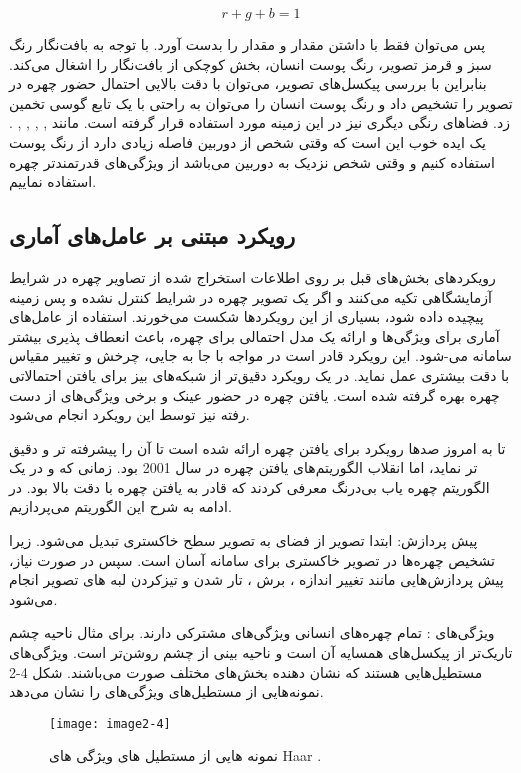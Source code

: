 \begin{equation}\label{eq2-3}
r + g + b = 1
\end{equation}
 	
پس می‌توان فقط با داشتن مقدار  و  مقدار  را بدست آورد. با توجه به بافت‌نگار  رنگ سبز و قرمز تصویر، رنگ پوست انسان، بخش کوچکی از بافت‌نگار را اشغال می‌کند. بنابراین با بررسی پیکسل‌های تصویر، می‌توان با دقت بالایی احتمال حضور چهره در تصویر را تشخیص داد و رنگ پوست انسان را می‌توان به راحتی با یک تابع گوسی تخمین زد. فضاهای رنگی دیگری نیز در این زمینه مورد استفاده قرار گرفته است. مانند
,
,
,
,
.
یک ایده خوب این است که وقتی شخص از دوربین فاصله زیادی دارد از رنگ پوست استفاده کنیم و وقتی شخص نزدیک به دوربین می‌باشد از ویژگی‌های قدرتمندتر چهره استفاده نماییم.

\subsection{رویکرد مبتنی بر عامل‌های آماری}
رویکرد‌های بخش‌های قبل بر روی اطلاعات استخراج شده از تصاویر چهره در شرایط آزمایشگاهی تکیه می‌کنند و اگر یک تصویر چهره در شرایط کنترل نشده و پس زمینه پیچیده داده شود، بسیاری از این رویکردها شکست می‌خورند. استفاده از عامل‌های آماری  برای ویژگی‌ها و ارائه یک مدل احتمالی برای چهره، باعث انعطاف پذیری بیشتر سامانه می-شود. این رویکرد قادر است در مواجه با جا به جایی، چرخش و تغییر مقیاس با دقت بیشتری عمل نماید. در یک رویکرد دقیق‌تر از شبکه‌های بیز  برای یافتن احتمالاتی چهره بهره گرفته شده است. یافتن چهره در حضور عینک و برخی ویژگی‌های از دست رفته نیز توسط این رویکرد انجام می‌شود.

\noindent
تا به امروز صدها رویکرد برای یافتن چهره ارائه شده است تا آن را پیشرفته تر و دقیق تر نماید، اما انقلاب الگوریتم‌های یافتن چهره در سال 2001 بود. زمانی که  و  در \cite{990517} یک الگوریتم چهره یاب بی‌درنگ معرفی کردند که قادر به یافتن چهره با دقت بالا بود. در ادامه به شرح این الگوریتم می‌پردازیم.

\noindent
پیش پردازش: ابتدا تصویر از فضای  به تصویر سطح خاکستری تبدیل می‌شود. زیرا تشخیص چهره‌ها در تصویر خاکستری برای سامانه آسان است. سپس در صورت نیاز، پیش پردازش‌هایی مانند تغییر اندازه ، برش ، تار شدن  و تیزکردن لبه های تصویر  انجام می‌شود. 

\noindent
ویژگی‌های : تمام چهره‌های انسانی ویژگی‌های مشترکی دارند. برای مثال ناحیه چشم تاریک‌تر از پیکسل‌های همسایه آن است و ناحیه بینی از چشم روشن‌تر است. ویژگی‌های  مستطیل‌هایی هستند که نشان دهنده بخش‌های مختلف صورت می‌باشند. شکل ‏2-4 نمونه‌هایی از مستطیل‌های ویژگی‌های  را نشان می‌دهد.
\begin{figure}[h]
\centering
  \texttt{[image: image2-4]}
  \caption{نمونه هایی از مستطیل های ویژگی های Haar \cite{ref1}.}
  \label{image2-4}
\end{figure}

